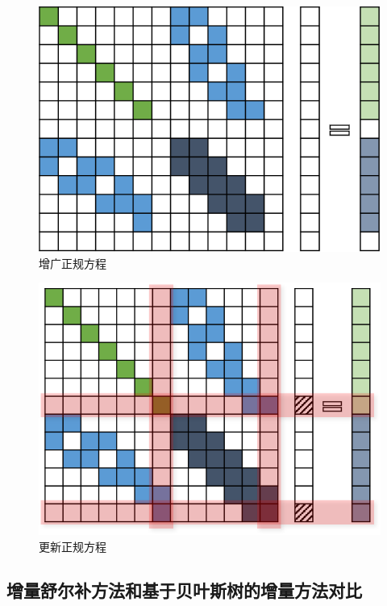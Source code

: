 \begin{figure}[htbp]
    \centering
    \includegraphics{./figs/normal_eq_aug.png}
    \caption{增广正规方程}
\end{figure}

\begin{figure}[htbp]
    \centering
    \includegraphics{./figs/normal_eq_update.png}
    \caption{更新正规方程}
\end{figure}

\subsection{增量舒尔补方法和基于贝叶斯树的增量方法对比}

